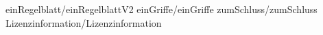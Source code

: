 
 {einRegelblatt/einRegelblattV2}
 {einGriffe/einGriffe}
 {zumSchluss/zumSchluss}
 {Lizenzinformation/Lizenzinformation}

